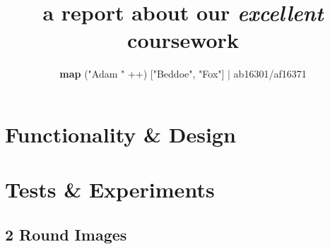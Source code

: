 \documentclass[11pt, oneside]{article}
\title{a report about our \emph{excellent} coursework}
\author{\textbf{map} ("Adam " ++) ["Beddoe", "Fox"]   |  ab16301/af16371 }
\date{\vspace{-5mm}}
\begin{document}
\maketitle

\section{Functionality \& Design}


\pagebreak
\section{Tests \& Experiments}


\subsection{2 Round Images}
\end{document}

